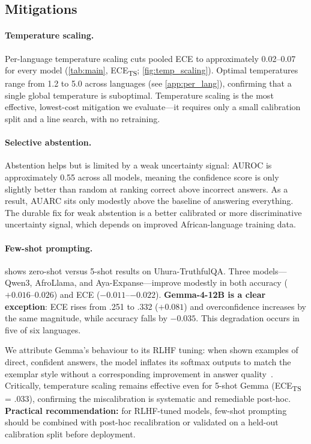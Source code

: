 \documentclass[11pt,a4paper]{article}
\begin{document}
\subsection{Mitigations}

\paragraph{Temperature scaling.}
Per-language temperature scaling cuts pooled ECE to approximately 0.02--0.07 for
every model (\cref{tab:main}, ECE\textsubscript{TS}; \cref{fig:temp_scaling}).
Optimal temperatures range from 1.2 to 5.0 across languages (see
\cref{app:per_lang}), confirming that a single global temperature is
suboptimal. Temperature scaling is the most effective, lowest-cost mitigation
we evaluate---it requires only a small calibration split and a line search,
with no retraining.

\paragraph{Selective abstention.}
Abstention helps but is limited by a weak uncertainty signal: AUROC is
approximately 0.55 across all models, meaning the confidence score is only
slightly better than random at ranking correct above incorrect answers. As a
result, AUARC sits only modestly above the baseline of answering everything. The
durable fix for weak abstention is a better calibrated or more discriminative
uncertainty signal, which depends on improved African-language training data.

\paragraph{Few-shot prompting.}
 shows zero-shot versus 5-shot results on Uhura-TruthfulQA.
Three models---Qwen3, AfroLlama, and Aya-Expanse---improve modestly in both
accuracy ($+0.016$--$0.026$) and ECE ($-0.011$--$-0.022$). \textbf{Gemma-4-12B
is a clear exception}: ECE rises from .251 to .332 ($+0.081$) and overconfidence
increases by the same magnitude, while accuracy falls by $-0.035$. This
degradation occurs in five of six languages.

We attribute Gemma's behaviour to its RLHF tuning: when shown examples of direct,
confident answers, the model inflates its softmax outputs to match the exemplar
style without a corresponding improvement in answer quality~\citep{guo2017calibration}.
Critically, temperature scaling remains effective even for 5-shot Gemma
(ECE\textsubscript{TS} = .033), confirming the miscalibration is systematic
and remediable post-hoc. \textbf{Practical recommendation:} for RLHF-tuned
models, few-shot prompting should be combined with post-hoc recalibration or
validated on a held-out calibration split before deployment.
\end{document}
